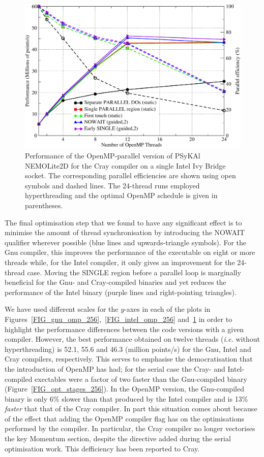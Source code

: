 \documentclass[gmd, manuscript]{copernicus}
\newlength{\picwidth}
\begin{document}
\begin{figure}
\centering
\includegraphics[width=\picwidth]{omp_scaling_256_cray}
\caption{Performance of the OpenMP-parallel version of {PS}y{KA}l
  NEMOLite2D for the Cray compiler on a single Intel Ivy Bridge
  socket.  The corresponding parallel efficiencies are shown using
  open symbols and dashed lines. The 24-thread runs employed
  hyperthreading and the optimal OpenMP schedule is given in
  parentheses.}
\label{FIG_cray_omp_256}
\end{figure}

The final optimisation step that we found to have any significant
effect is to minimise the amount of thread synchronisation by
introducing the NOWAIT qualifier wherever possible (blue lines and
upwards-triangle symbols). For the Gnu compiler, this improves the
performance of the executable on eight or more threads while, for the
Intel compiler, it only gives an improvement for the 24-thread
case. Moving the SINGLE region before a parallel loop is marginally
beneficial for the Gnu- and Cray-compiled binaries and yet reduces the
performance of the Intel binary (purple lines and right-pointing
triangles).

We have used different scales for the $y$-axes in each of the plots in
Figures~\ref{FIG_gnu_omp_256},~\ref{FIG_intel_omp_256}
and~\ref{FIG_cray_omp_256} in order to highlight the performance
differences between the code versions with a given compiler. However,
the best performance obtained on twelve threads (\textit{i.e.}  without
hyperthreading) is 52.1, 55.6 and 46.3 (million points/s) for the Gnu,
Intel and Cray compilers, respectively. This serves to emphasise the
democratisation that the introduction of OpenMP has had; for the
serial case the Cray- and Intel-compiled exectables were a factor of
two faster than the Gnu-compiled binary
(Figure~\ref{FIG_opt_stages_256}). In the OpenMP version, the
Gnu-compiled binary is only 6\% slower than that produced by the Intel
compiler and is 13\% \textit{faster} that that of the Cray compiler. In
part this situation comes about because of the effect that adding the
OpenMP compiler flag has on the optimisations performed by the
compiler.  In particular, the Cray compiler no longer vectorises the
key Momentum section, despite the directive added during the serial
optimisation work. This defficiency has been reported to Cray.
\end{document}
